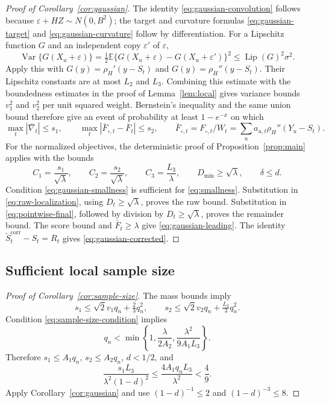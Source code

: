 \documentclass[11pt]{article}
\newcommand{\E}{\mathbb{E}}
\newcommand{\IFPt}{F_{\circ,t}}
\theoremstyle{definition}
\begin{document}
\begin{proof}[Proof of Corollary~\ref{cor:gaussian}]
The identity \eqref{eq:gaussian-convolution} follows because
\(\varepsilon+HZ\sim N(0,B^2)\); the target and curvature formulas
\eqref{eq:gaussian-target} and \eqref{eq:gaussian-curvature} follow by
differentiation.  For a Lipschitz function \(G\) and an independent copy
\(\varepsilon'\) of \(\varepsilon\),
\[
  \operatorname{Var}\{G(X_u+\varepsilon)\}
  =\tfrac12\E\{G(X_u+\varepsilon)-G(X_u+\varepsilon')\}^2
  \leq\operatorname{Lip}(G)^2\sigma^2.
\]
Apply this with \(G(y)=\rho_H'(y-S_t)\) and
\(G(y)=\rho_H''(y-S_t)\).  Their Lipschitz constants are at most \(L_2\)
and \(L_3\).  Combining this estimate with the boundedness estimates in the
proof of Lemma~\ref{lem:local} gives variance bounds \(v_1^2\) and \(v_2^2\)
per unit squared weight.  Bernstein's inequality and the same union bound
therefore give an event of probability at least \(1-e^{-x}\) on which
\[
  \max_t|\bar\nabla_t|\leq s_1,\qquad
  \max_t|\bar F_{\circ,t}-\bar F_t|\leq s_2,
  \qquad
  \bar F_{\circ,t}=\IFPt/W_t=\sum_u a_{u,t}\rho_H''(Y_u-S_t).
\]
For the normalized objectives, the deterministic proof of
Proposition~\ref{prop:main} applies with the bounds
\[
  C_1=\frac{s_1}{\sqrt\lambda},\qquad
  C_2=\frac{s_2}{\sqrt\lambda},\qquad
  C_3=\frac{L_3}{\lambda},\qquad
  D_{\min}\geq\sqrt\lambda,\qquad\delta\leq d.
\]
Condition \eqref{eq:gaussian-smallness} is sufficient for
\eqref{eq:smallness}.  Substitution in \eqref{eq:raw-localization}, using
\(D_t\geq\sqrt\lambda\), proves the raw bound.  Substitution in
\eqref{eq:pointwise-final}, followed by division by \(D_t\geq\sqrt\lambda\),
proves the remainder bound.  The score bound and
\(\bar F_t\geq\lambda\) give \eqref{eq:gaussian-leading}.
The identity \(\widetilde S_t^{\mathrm{corr}}-S_t=R_t\) gives
\eqref{eq:gaussian-corrected}.
\end{proof}

\subsection{Sufficient local sample size}

\begin{proof}[Proof of Corollary~\ref{cor:sample-size}]
The mass bounds imply
\[
  s_1\leq\sqrt2v_1q_n+\tfrac23q_n^2,\qquad
  s_2\leq\sqrt2v_2q_n+\tfrac{L_2}{3}q_n^2.
\]
Condition \eqref{eq:sample-size-condition} implies
\[
  q_n<\min\left\{1,\frac{\lambda}{2A_2},
                    \frac{\lambda^2}{9A_1L_3}\right\}.
\]
Therefore \(s_1\leq A_1q_n\), \(s_2\leq A_2q_n\), \(d<1/2\), and
\[
  \frac{s_1L_3}{\lambda^2(1-d)^2}
  \leq\frac{4A_1q_nL_3}{\lambda^2}<\frac49.
\]
Apply Corollary~\ref{cor:gaussian} and use
\((1-d)^{-1}\leq2\) and \((1-d)^{-3}\leq8\).
\end{proof}
\end{document}
